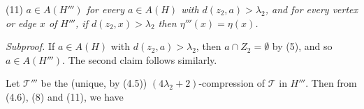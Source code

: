 \hspace*{12pt}(11) \textit{$a \in A(H''')$ for every $a \in A(H)$ with $d(z_2, a) > \lambda_2$, and for every vertex or edge $x$ of $H'''$, if $d(z_2, x) > \lambda_2$ then $\eta'''(x) = \eta(x)$.}

\textit{Subproof.} If $a \in A(H)$ with $d(z_2, a) > \lambda_2$, then $a \cap Z_2 = \emptyset$ by (5), and so $a \in A(H''')$. The second claim follows similarly.

Let $\mathcal{T}'''$ be the (unique, by (4.5)) $(4\lambda_2 + 2)$-compression of $\mathcal{T}$ in $H'''$. Then from (4.6), (8) and (11), we have
